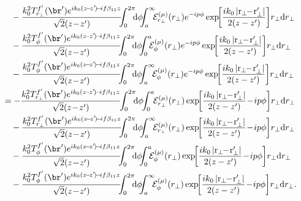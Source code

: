\documentclass[]{report}
\begin{document}
\begin{align}
&\quad - \frac{k_0^2 T^{f'}_{r_\perp}(\br') e^{ik_0(z\!-\!z'\!)\!-\!if\beta_{11} z}}{\sqrt{2}(z\!-\!z')}  \!\!\! \int_0^{2\pi}\!\!\! \mathrm{d}\phi \!\!\! \int_a^\infty \!\!\! {\mathcal{E}^{(\mu)}_{r_\perp}} (r_\perp) e^{-i p\phi} \exp\!\! \left[ \frac{ik_0 \left| \mathrm{r}_\perp\!\! -\! \mathrm{r}_\perp'\right|}{2(z-z')}  \right]\!  r_\perp \mathrm{d}r_\perp \nonumber\\
&\quad - \frac{k_0^2 T^{f'}_\phi(\br') e^{ik_0(z\!-\!z'\!)\!-\!if\beta_{11} z}}{\sqrt{2}(z\!-\!z')} \!\!\! \int_0^{2\pi}\!\!\! \mathrm{d}\phi \!\!\! \int_0^a \!\!\! {\mathcal{E}^{(\mu)}_\phi} (r_\perp) e^{-i p\phi} \exp\!\! \left[ \frac{ik_0 \left| \mathrm{r}_\perp\!\! -\! \mathrm{r}_\perp'\right|}{2(z-z')}  \right]\!  r_\perp \mathrm{d}r_\perp \nonumber\\
&\quad - \frac{k_0^2 T^{f'}_\phi(\br') e^{ik_0(z\!-\!z'\!)\!-\!if\beta_{11} z}}{\sqrt{2}(z\!-\!z')}  \!\!\! \int_0^{2\pi}\!\!\!\mathrm{d}\phi\!\!\!  \int_a^\infty \!\!\! {\mathcal{E}^{(\mu)}_\phi} (r_\perp) e^{-i p\phi} \exp\!\! \left[ \frac{ik_0 \left| \mathrm{r}_\perp\!\! -\! \mathrm{r}_\perp'\right|}{2(z-z')}  \right]\!  r_\perp \mathrm{d}r_\perp \\
&=  - \frac{k_0^2 T^{f'}_{r_\perp}(\br') e^{ik_0(z\!-\!z'\!)\!-\!if\beta_{11} z}}{\sqrt{2}(z\!-\!z')} \!\! \int_0^{2\pi}\!\!\! \mathrm{d}\phi \!\! \int_0^a  \!\! \mathcal{E}^{(\mu)}_{r_\perp}(r_\perp)  
\exp\!\! \left[ \frac{ik_0 \left| \mathrm{r}_\perp\!\! -\! \mathrm{r}_\perp'\right|}{2(z-z')} \!-\! i p\phi  \right]\!  r_\perp \mathrm{d}r_\perp \nonumber\\
&\quad - \frac{k_0^2 T^{f'}_{r_\perp}(\br') e^{ik_0(z\!-\!z'\!)\!-\!if\beta_{11} z}}{\sqrt{2}(z\!-\!z')}  \!\!\! \int_0^{2\pi}\!\!\!\mathrm{d}\phi \!\!\! \int_a^\infty \!\!\! {\mathcal{E}^{(\mu)}_{r_\perp}} (r_\perp)  \exp\!\! \left[ \frac{ik_0 \left| \mathrm{r}_\perp\!\! -\! \mathrm{r}_\perp'\right|}{2(z-z')} \!-\! i p\phi \right]\!  r_\perp \mathrm{d}r_\perp \nonumber\\
&\quad - \frac{k_0^2 T^{f'}_\phi(\br') e^{ik_0(z\!-\!z'\!)\!-\!if\beta_{11} z}}{\sqrt{2}(z\!-\!z')} \!\!\! \int_0^{2\pi} \!\!\! \mathrm{d}\phi \!\!\! \int_0^a\!\!\! {\mathcal{E}^{(\mu)}_\phi} (r_\perp) \exp\!\! \left[ \frac{ik_0 \left| \mathrm{r}_\perp\!\! -\! \mathrm{r}_\perp'\right|}{2(z-z')} \!-\! i p\phi \right]\!  r_\perp \mathrm{d}r_\perp \nonumber\\
&\quad - \frac{k_0^2 T^{f'}_\phi(\br') e^{ik_0(z\!-\!z'\!)\!-\!if\beta_{11} z}}{\sqrt{2}(z\!-\!z')}  \!\!\! \int_0^{2\pi}\!\!\! \mathrm{d}\phi \!\!\! \int_a^\infty \!\!\! {\mathcal{E}^{(\mu)}_\phi} (r_\perp) \exp\!\! \left[ \frac{ik_0 \left| \mathrm{r}_\perp\!\! -\! \mathrm{r}_\perp'\right|}{2(z-z')} \!-\! i p\phi \right]\!  r_\perp \mathrm{d}r_\perp. \label{Cmu1}
\end{align}
\end{document}

